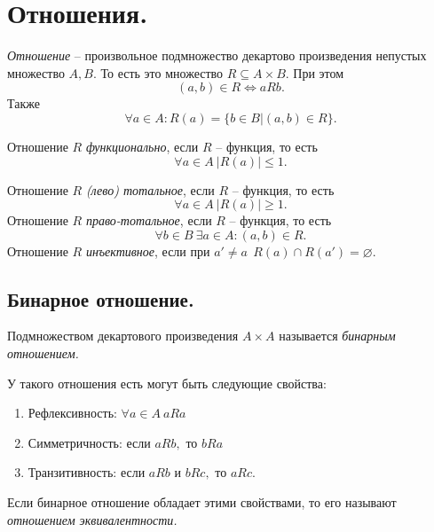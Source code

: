 
\section{Отношения.}

\begin{definition}
    \textit{Отношение} -- произвольное подмножество декартово произведения непустых множество $A, B.$ То есть это  множество $R \subseteq A \times B.$ При этом $$(a, b) \in R \Longleftrightarrow a R b.$$
    Также 
    $$\forall a \in A: R(a) = \{ b \in B| (a, b) \in R\}.$$
\end{definition}

\begin{definition}
    Отношение $R$ \textit{функционально}, если $R$ -- функция, то есть $$\forall a \in A \ |R(a)| \leq 1.$$ 
\end{definition}

\begin{definition}
    Отношение $R$ \textit{(лево) тотальное}, если $R$ -- функция, то есть $$\forall a \in A \ |R(a)| \geq 1.$$ 
    Отношение $R$ \textit{право-тотальное}, если $R$ -- функция, то есть $$\forall b \in B \  \exists a \in A: (a, b) \in R.$$ 
    Отношение $R$ \textit{инъективное}, если при $a' \neq a \ \  R(a) \cap R(a') = \varnothing.$ 
\end{definition}

\subsection{Бинарное отношение.}

\begin{definition}
    Подмножеством декартового произведения $A \times A$ называется \textit{бинарным отношением.}
\end{definition}

У такого отношения есть могут быть следующие свойства:
\begin{enumerate}
    \item Рефлексивность: $\forall a \in A \ a R a$
    \item Симметричность: если $a R b,$ то $b R a$
    \item Транзитивность: если $a R b$ и $b R c,$  то $a R c.$
\end{enumerate}

\begin{definition}
    Если бинарное отношение обладает этими свойствами, то его называют \textit{отношением эквивалентности.}
\end{definition}

